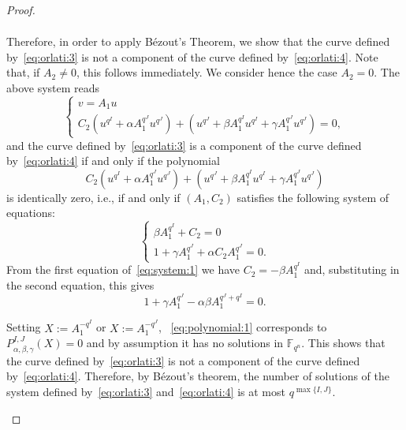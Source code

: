 \documentclass[11pt]{article}
\theoremstyle{definition}
\numberwithin{equation}{section}
\begin{document}
\begin{proof}
\begin{enumerate}
\begin{equation*}
\begin{split}
\end{split}
\end{equation*}
Therefore, in order to apply Bézout's Theorem, we show that the curve defined by~\eqref{eq:orlati:3} is not a component of the curve defined by~\eqref{eq:orlati:4}. Note that, if $A_2\neq 0$, this follows immediately. We consider hence the case $A_2=0$. The above system reads 
\begin{equation*}
    \begin{cases}
    v = A_1 u \\
    C_2 \left(u^{q^I} + \alpha A_1^{q^J}u^{q^J}\right) + \left(u^{q^J} + \beta A_1^{q^I}u^{q^I} + \gamma A_1^{q^J}u^{q^J}\right) = 0,
    \end{cases}
\end{equation*}
and the curve defined by~\eqref{eq:orlati:3} is a component of the curve defined by~\eqref{eq:orlati:4} if and only if the polynomial
\begin{equation*}
    C_2 \left(u^{q^I} + \alpha A_1^{q^J}u^{q^J}\right) + \left(u^{q^J} + \beta A_1^{q^I}u^{q^I} + \gamma A_1^{q^J}u^{q^J}\right)
\end{equation*}
is identically zero, i.e., if and only if $(A_1,C_2)$ satisfies the following system of equations:
\begin{equation}
\label{eq:system:1}
    \begin{cases}
    \beta A_1^{q^I} + C_2 = 0 \\
    1 + \gamma A_1^{q^J} + \alpha C_2 A_1^{q^J} = 0.
    \end{cases}
\end{equation}
From the first equation of~\eqref{eq:system:1} we  have $C_2 = -\beta A_1^{q^I}$ and, substituting in the second equation, this gives
\begin{equation}
    \label{eq:polynomial:1}
    1 + \gamma A_1^{q^J} - \alpha\beta A_1^{q^J + q^I} = 0.
\end{equation}

Setting $X:= A_1^{-q^{I}}$ or $X:= A_1^{-q^{J}}$, ~\eqref{eq:polynomial:1} corresponds to  $P^{I,J}_{\alpha,\beta,\gamma}(X)=0$ and by assumption it  has no solutions in $\mathbb{F}_{q^n}$. This  shows that the curve defined by~\eqref{eq:orlati:3} is not a component of the curve defined by~\eqref{eq:orlati:4}.  Therefore, by B\'ezout's theorem, the number of solutions of the system defined by~\eqref{eq:orlati:3} and~\eqref{eq:orlati:4} is at most $q^{\max\{I,J\}}$.


\end{enumerate}
\end{proof}
\end{document}
